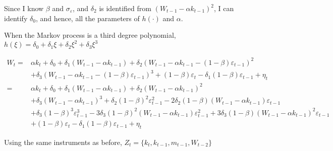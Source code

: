 \documentclass[
  letterpaper,
  DIV=11,
  numbers=noendperiod]{scrartcl}
\begin{document}
Since I know \(\beta\) and \(\sigma_{\varepsilon}\), and \(\delta_2\) is
identified from \(\left(W_{t-1}-\alpha k_{t-1}\right)^2\), I can
identify \(\delta_0\), and hence, all the parameters of \(h(\cdot)\) and
\(\alpha\).

When the Markov process is a third degree polynomial,
\(h(\xi)=\delta_0+\delta_1 \xi + \delta_2 \xi^2 + \delta_3 \xi^3\)

\[
\begin{aligned}
    W_{t} =& \alpha k_t + \delta_0 + \delta_1 \left(W_{t-1}-\alpha k_{t-1}\right) + \delta_2 \left(W_{t-1}-\alpha k_{t-1}-(1-\beta)\varepsilon_{t-1}\right)^2 \\
    &+ \delta_3 \left(W_{t-1}-\alpha k_{t-1}-(1-\beta)\varepsilon_{t-1}\right)^3 + (1-\beta)\varepsilon_t - \delta_1 (1-\beta)\varepsilon_{t-1} + \eta_t \\
    =& \alpha k_t + \delta_0 + \delta_1 \left(W_{t-1}-\alpha k_{t-1}\right) + \delta_2 \left(W_{t-1}-\alpha k_{t-1}\right)^2\\
    &+ \delta_3 \left(W_{t-1}-\alpha k_{t-1}\right)^3 + \delta_2(1-\beta)^2\varepsilon_{t-1}^2 - 2\delta_2(1-\beta)\left(W_{t-1}-\alpha k_{t-1}\right)\varepsilon_{t-1}\\
    &+ \delta_3(1-\beta)^3\varepsilon_{t-1}^3 - 3\delta_3(1-\beta)^2\left(W_{t-1}-\alpha k_{t-1}\right)\varepsilon_{t-1}^2 + 3\delta_3(1-\beta)\left(W_{t-1}-\alpha k_{t-1}\right)^2\varepsilon_{t-1}\\
    &+ (1-\beta)\varepsilon_t - \delta_1 (1-\beta)\varepsilon_{t-1} + \eta_t 
\end{aligned}
\]

Using the same instruments as before,
\(Z_t=\{k_t,k_{t-1},m_{t-1},W_{t-2}\}\)
\end{document}
